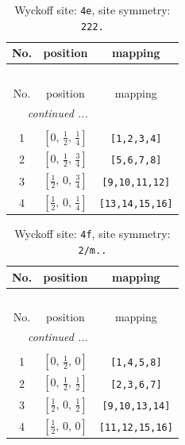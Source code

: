 \documentclass[fleqn,8pt]{jsarticle}
\begin{document}
\begin{longtable}{ccc}
\caption{Wyckoff site: {\tt 4e}, site symmetry: {\tt 222.}}
 \\
 \hline \hline
No. & position & mapping \\ \hline \endfirsthead

\multicolumn{2}{l}{\tablename\ \thetable{}} \\
 \hline \hline
No. & position & mapping \\ \hline \endhead

 \hline \hline
\multicolumn{2}{r}{\footnotesize\it continued ...} \\ \endfoot

 \hline \hline
\multicolumn{2}{r}{} \\ \endlastfoot

1 & $\left[ 0,\, \frac{1}{2},\, \frac{1}{4} \right]$ & {\tt [1,2,3,4]} \\ \hline
2 & $\left[ 0,\, \frac{1}{2},\, \frac{3}{4} \right]$ & {\tt [5,6,7,8]} \\ \hline
3 & $\left[ \frac{1}{2},\, 0,\, \frac{3}{4} \right]$ & {\tt [9,10,11,12]} \\ \hline
4 & $\left[ \frac{1}{2},\, 0,\, \frac{1}{4} \right]$ & {\tt [13,14,15,16]} \\
\end{longtable}
\renewcommand{\arraystretch}{1.2}
\begin{longtable}{ccc}
\caption{Wyckoff site: {\tt 4f}, site symmetry: {\tt 2/m..}}
 \\
 \hline \hline
No. & position & mapping \\ \hline \endfirsthead

\multicolumn{2}{l}{\tablename\ \thetable{}} \\
 \hline \hline
No. & position & mapping \\ \hline \endhead

 \hline \hline
\multicolumn{2}{r}{\footnotesize\it continued ...} \\ \endfoot

 \hline \hline
\multicolumn{2}{r}{} \\ \endlastfoot

1 & $\left[ 0,\, \frac{1}{2},\, 0 \right]$ & {\tt [1,4,5,8]} \\ \hline
2 & $\left[ 0,\, \frac{1}{2},\, \frac{1}{2} \right]$ & {\tt [2,3,6,7]} \\ \hline
3 & $\left[ \frac{1}{2},\, 0,\, \frac{1}{2} \right]$ & {\tt [9,10,13,14]} \\ \hline
4 & $\left[ \frac{1}{2},\, 0,\, 0 \right]$ & {\tt [11,12,15,16]} \\
\end{longtable}
\end{document}
